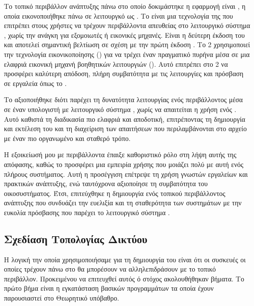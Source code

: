 Το τοπικό περιβάλλον ανάπτυξης πάνω στο οποίο δοκιμάστηκε η εφαρμογή είναι ,  η οποία εικονοποιήθηκε πάνω σε λειτουργκό  ως . 
Το  είναι μια τεχνολογία της  που επιτρέπει στους χρήστες  να τρέχουν  
περιβάλλοντα απευθείας στο λειτουργικό σύστημα , χωρίς την ανάγκη για εξομοιωτές ή εικονικές μηχανές. 
Είναι η δεύτερη έκδοση του  και αποτελεί σημαντική βελτίωση σε σχέση με την πρώτη έκδοση . Το  2 χρησιμοποιεί την τεχνολογία εικονικοποίησης () για να 
τρέχει έναν πραγματικό πυρήνα  μέσα σε μια ελαφριά εικονική μηχανή βοηθητικών λειτουργιών (). Αυτό επιτρέπει στο  2 να προσφέρει 
καλύτερη απόδοση, πλήρη συμβατότητα με τις λειτουργίες  και πρόσβαση σε εργαλεία όπως το .


Το  αξιοποιήθηκε διότι παρέχει τη δυνατότητα λειτουργίας ενός 
περιβάλλοντος  μέσα σε έναν υπολογιστή με λειτουργικό 
σύστημα , χωρίς να απαιτείται η χρήση ενός . 
Αυτό καθιστά τη διαδικασία πιο ελαφριά και αποδοτική, επιτρέποντας τη 
δημιουργία και εκτέλεση του  και τη διαχείριση των 
απαιτήσεων που περιλαμβάνονται στο αρχείο  με έναν πιο οργανωμένο και σταθερό τρόπο.

Η εξοικείωσή μου με περιβάλλοντα  έπαιξε καθοριστικό ρόλο 
στη λήψη αυτής της απόφασης, καθώς το  προσφέρει μια 
εμπειρία χρήσης που μοιάζει πολύ με αυτή ενός πλήρους  
συστήματος. Αυτή η προσέγγιση επέτρεψε τη χρήση γνωστών εργαλείων και 
πρακτικών ανάπτυξης, ενώ ταυτόχρονα αξιοποίησε τη συμβατότητα του  
οικοσυστήματος. Έτσι, επιτεύχθηκε η δημιουργία ενός τοπικού περιβάλλοντος 
ανάπτυξης που συνδυάζει την ευελιξία και τη σταθερότητα των  
συστημάτων με την ευκολία πρόσβασης που παρέχει το λειτουργικό σύστημα .

\subsection{Σχεδίαση Τοπολογίας Δικτύου}

Η λογική την οποία χρησιμοποιήσαμε για τη δημιουργία του  
είναι ότι οι συσκευές οι οποίες τρέχουν πάνω στο  θα μπορέσουν
να αλληλεπιδράσουν με το τοπικό  περιβάλλον. Προκειμένου να επιτευχθεί αυτός ό στόχος
ακολουθήθηκαν βήματα. Το πρώτο βήμα είναι η εγκατάσταση βασικών προγραμμάτων τα οποία έχουν παρουσιαστεί στο Θεωρητικό υπόβαθρο.

